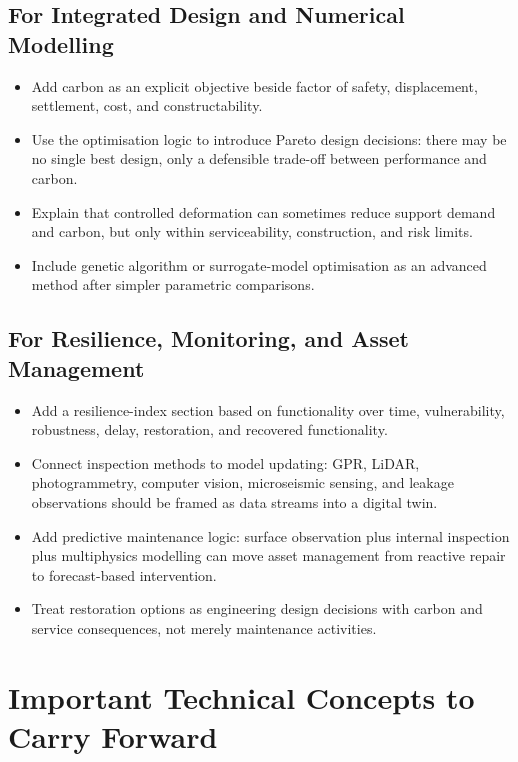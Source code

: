 \documentclass[11pt]{article}
\begin{document}
\subsection*{For Integrated Design and Numerical Modelling}

\begin{itemize}
  \item Add carbon as an explicit objective beside factor of safety,
  displacement, settlement, cost, and constructability.
  \item Use the optimisation logic to introduce Pareto design decisions:
  there may be no single best design, only a defensible trade-off between
  performance and carbon.
  \item Explain that controlled deformation can sometimes reduce support demand
  and carbon, but only within serviceability, construction, and risk limits.
  \item Include genetic algorithm or surrogate-model optimisation as an
  advanced method after simpler parametric comparisons.
\end{itemize}

\subsection*{For Resilience, Monitoring, and Asset Management}

\begin{itemize}
  \item Add a resilience-index section based on functionality over time,
  vulnerability, robustness, delay, restoration, and recovered functionality.
  \item Connect inspection methods to model updating: GPR, LiDAR, photogrammetry,
  computer vision, microseismic sensing, and leakage observations should be
  framed as data streams into a digital twin.
  \item Add predictive maintenance logic: surface observation plus internal
  inspection plus multiphysics modelling can move asset management from
  reactive repair to forecast-based intervention.
  \item Treat restoration options as engineering design decisions with carbon
  and service consequences, not merely maintenance activities.
\end{itemize}

\section{Important Technical Concepts to Carry Forward}
\end{document}
